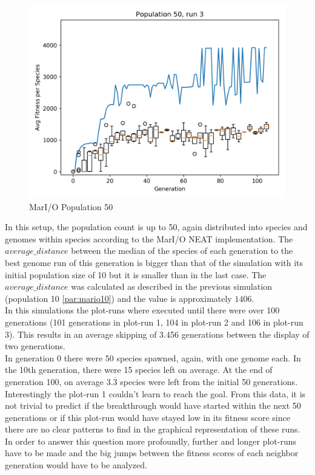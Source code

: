 \begin{figure}[h]
\begin{minipage}{0.33\textwidth}
				\end{minipage}
				\begin{minipage}{0.33\textwidth}
					\centering
					\includegraphics[width=1\textwidth]{graphics/mario/pop50_run3} %
				\end{minipage}
				\caption{MarI/O Population 50}
				\label{fig:mario50}
			\end{figure}
			In this setup, the population count is up to 50, again distributed into species and genomes within species according to the MarI/O NEAT implementation. The $average\_distance$  between the median of the species of each generation to the best genome run of this generation is bigger than that of the simulation with its initial population size of 10 but it is smaller than in the last case. The $average\_distance$ was calculated as described in the previous simulation (population 10 \ref{par:mario10}) and the value is approximately $1406$.\\
			In this simulations the plot-runs where executed until there were over 100 generations (101 generations in plot-run 1, 104 in plot-run 2 and 106 in plot-run 3). This results in an average skipping of 3.456 generations between the display of two generations.\\
			In generation 0 there were 50 species spawned, again, with one genome each. In the 10th generation, there were 15 species left on average. At the end of generation 100, on average $3.\overline{3}$ species were left from the initial 50 generations.\\
			Interestingly the plot-run 1 couldn't learn to reach the goal. From this data, it is not trivial to predict if the breakthrough would have started within the next 50 generations or if this plot-run would have stayed low in its fitness score since there are no clear patterns to find in the graphical representation of these runs. In order to answer this question more profoundly, further and longer plot-runs have to be made and the big jumps between the fitness scores of each neighbor generation would have to be analyzed.\\
